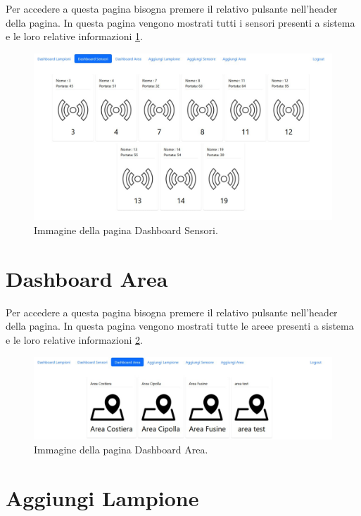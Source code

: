 Per accedere a questa pagina bisogna premere il relativo pulsante nell'header della pagina. In questa pagina vengono mostrati tutti i sensori presenti a sistema e le loro relative informazioni \ref{fig:lista_sensori}.

\begin{figure}[ht]
    \centering
    \includegraphics[width=\textwidth]{img/lista_sensori.jpeg}
    \caption{Immagine della pagina Dashboard Sensori.}
    \label{fig:lista_sensori}
\end{figure}

\section{Dashboard Area}

Per accedere a questa pagina bisogna premere il relativo pulsante nell'header della pagina. In questa pagina vengono mostrati tutte le areee presenti a sistema e le loro relative informazioni \ref{fig:lista_area}.

\begin{figure}[ht]
    \centering
    \includegraphics[width=\textwidth]{img/lista_area.jpeg}
    \caption{Immagine della pagina Dashboard Area.}
    \label{fig:lista_area}
\end{figure}

\section{Aggiungi Lampione}

